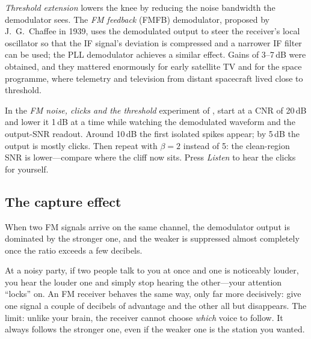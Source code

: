\emph{Threshold extension} lowers the knee by reducing the noise bandwidth the demodulator sees. The
\emph{FM feedback} (FMFB) demodulator, proposed by J.~G.~Chaffee in 1939, uses the demodulated output to
steer the receiver's local oscillator so that the IF signal's deviation is compressed and a narrower IF
filter can be used; the PLL demodulator achieves a similar effect. Gains of 3--7\,dB were obtained, and they
mattered enormously for early satellite TV and for the space programme, where telemetry and television from
distant spacecraft lived close to threshold.

\begin{tryit}
In the \emph{FM noise, clicks and the threshold} experiment of , start at a CNR of 20\,dB and lower it
1\,dB at a time while watching the demodulated waveform and the output-SNR readout. Around 10\,dB the first
isolated spikes appear; by 5\,dB the output is mostly clicks. Then repeat with $\beta=2$ instead of 5: the
clean-region SNR is lower---compare where the cliff now sits. Press \emph{Listen} to hear the clicks for yourself.
\end{tryit}

\subsection{The capture effect}
\label{sec:ch04:capture}

When two FM signals arrive on the same channel, the demodulator output is dominated by the stronger one,
and the weaker is suppressed almost completely once the ratio exceeds a few decibels.

\begin{analogy}
At a noisy party, if two people talk to you at once and one is noticeably louder, you hear the louder one
and simply stop hearing the other---your attention ``locks'' on. An FM receiver behaves the same way, only
far more decisively: give one signal a couple of decibels of advantage and the other all but disappears.
The limit: unlike your brain, the receiver cannot choose \emph{which} voice to follow. It always follows the stronger one, even if the weaker one is the station you wanted.
\end{analogy}


